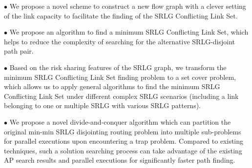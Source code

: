 
$\bullet$ We propose a novel scheme to construct a new flow graph with a clever setting of the link capacity to facilitate the finding of the SRLG Conflicting Link Set.

$\bullet$ We propose an algorithm to find a  minimum SRLG Conflicting Link Set, which helps to reduce the complexity of searching for the alternative SRLG-disjoint path pair.

$\bullet$ Based on the risk sharing features of the SRLG graph, we transform the minimum SRLG Conflicting Link Set finding problem to a set cover problem, which allows us to apply general algorithms to find the minimum SRLG Conflicting Link Set under different complex SRLG scenarios (including a link belonging to one or multiple SRLG with various SRLG patterns).

$\bullet$ We propose a novel divide-and-conquer algorithm which can partition the original min-min SRLG disjointing routing problem into multiple sub-problems for parallel executions upon encountering a trap problem.  Compared to existing techniques, such a solution searching process can take advantage of the existing AP search results and parallel executions for significantly faster path finding.

